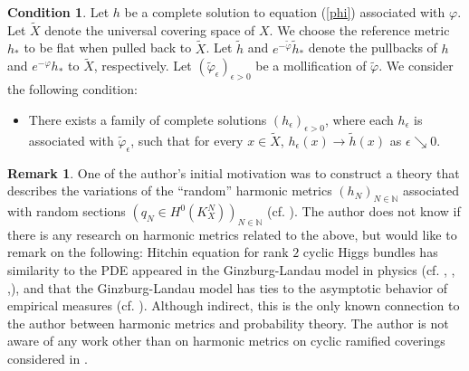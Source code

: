 \documentclass[12pt]{article}
\theoremstyle{definition}
\newtheorem{rem}[defi]{Remark}
\newtheorem{cond}[defi]{Condition}
\def\refe{\ast}
\def\N{{\mathbb N}}
\begin{document}
\begin{cond}\label{three} Let $h$ be a complete solution to equation (\ref{phi}) associated with $\varphi$. Let $\widetilde{X}$ denote the universal covering space of $X$. We choose the reference metric $h_\refe$ to be flat when pulled back to $\widetilde{X}$. Let $\widetilde{h}$ and $e^{-\widetilde{\varphi}}\widetilde{h}_\refe$ denote the pullbacks of $h$ and $e^{-\varphi}h_\refe$ to $\widetilde{X}$, respectively. Let $(\widetilde{\varphi}_\epsilon)_{\epsilon>0}$ be a mollification of $\widetilde{\varphi}$. We consider the following condition:
\begin{itemize}
\item There exists a family of complete solutions $(h_\epsilon)_{\epsilon>0}$, where each $h_\epsilon$ is associated with $\widetilde{\varphi}_\epsilon$, such that for every $x \in \widetilde{X}$, $h_\epsilon(x) \to \widetilde{h}(x)$ as $\epsilon \searrow 0$.
\end{itemize}
\end{cond}

\begin{rem} One of the author's initial motivation was to construct a theory that describes the variations of the ``random'' harmonic metrics $(h_N)_{N\in\N}$ associated with random sections $(q_N\in H^0(K_X^N))_{N\in\N}$ (cf. \cite{BCHM1, SZ1}). The author does not know if there is any research on harmonic metrics related to the above, but would like to remark on the following:
Hitchin equation for rank $2$ cyclic Higgs bundles has similarity to the PDE appeared in the Ginzburg-Landau model in physics (cf. \cite[Section 5]{DW1}, \cite[Section 11]{Hit1}, \cite{JT1},), and that the Ginzburg-Landau model has ties to the asymptotic behavior of empirical measures (cf. \cite{Ser1, Ser2}). Although indirect, this is the only known connection to the author between harmonic metrics and probability theory. 
The author is not aware of any work other than \cite{Miy2, Miy3} on harmonic metrics on cyclic ramified coverings 
considered in \cite{Miy2, Miy3}. 
\end{rem}
\end{document}
